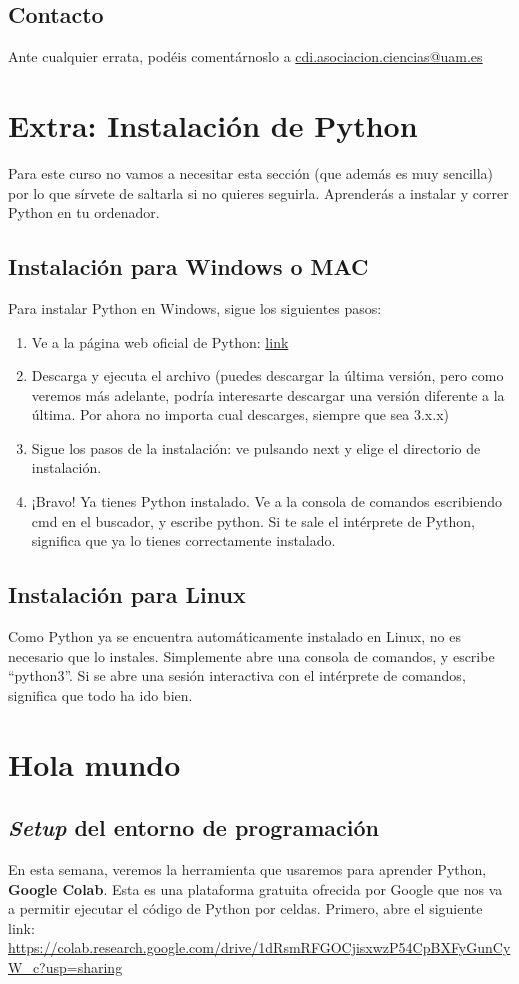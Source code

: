 \documentclass{article}
\begin{document}
\subsection{Contacto}
Ante cualquier errata, podéis comentárnoslo a \href{mailto:cdi.asociacion.ciencias@uam.es}{cdi.asociacion.ciencias@uam.es} 
\section{Extra: Instalación de Python}
Para este curso no vamos a necesitar esta sección (que además es muy sencilla) por lo que sírvete de saltarla si no quieres seguirla. Aprenderás a instalar y correr Python en tu ordenador.


\subsection{Instalación para Windows o MAC}
Para instalar Python en Windows, sigue los siguientes pasos:
\begin{enumerate}
    \item Ve a la página web oficial de Python: \href{https://www.python.org/}{link}
    \item Descarga y ejecuta el archivo (puedes descargar la última versión, pero como veremos más adelante, podría interesarte descargar una versión diferente a la última. Por ahora no importa cual descarges, siempre que sea 3.x.x)
    \item Sigue los pasos de la instalación: ve pulsando next y elige el directorio de instalación.
    \item ¡Bravo! Ya tienes Python instalado. Ve a la consola de comandos escribiendo cmd en el buscador, y escribe python. Si te sale el intérprete de Python, significa que ya lo tienes correctamente instalado.
\end{enumerate}
\subsection{Instalación para Linux}
Como Python ya se encuentra automáticamente instalado en Linux, no es necesario que lo instales. Simplemente abre una consola de comandos, y escribe ``python3''. Si se abre una sesión interactiva con el intérprete de comandos, significa que todo ha ido bien.
\section{Hola mundo}

\subsection{\textit{Setup} del entorno de programación}
En esta semana, veremos la herramienta que usaremos para aprender Python, \textbf{Google Colab}. Esta es una plataforma gratuita ofrecida por Google que nos va a permitir ejecutar el código de Python por celdas. Primero, abre el siguiente link: 
\url{https://colab.research.google.com/drive/1dRsmRFGOCjisxwzP54CpBXFyGunCyW_c?usp=sharing}
\end{document}
